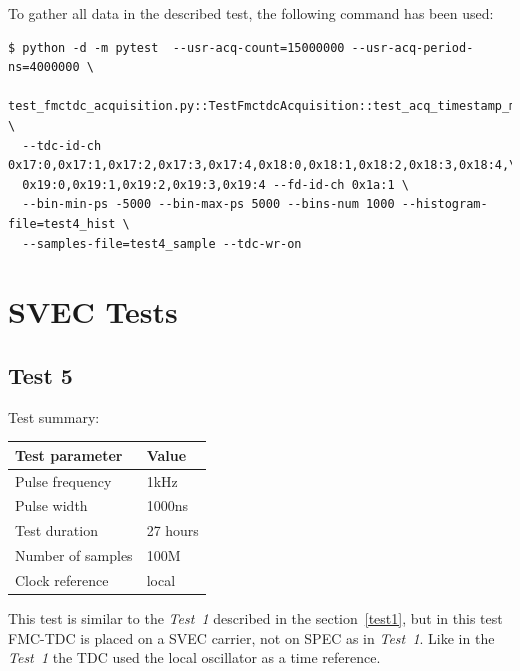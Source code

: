\documentclass[a4paper, 12pt]{article}
\begin{document}
\FloatBarrier

To gather all data in the described test, the following command has been used:
\begin{lstlisting}
$ python -d -m pytest  --usr-acq-count=15000000 --usr-acq-period-ns=4000000 \
  test_fmctdc_acquisition.py::TestFmctdcAcquisition::test_acq_timestamp_multiple_hist \
  --tdc-id-ch 0x17:0,0x17:1,0x17:2,0x17:3,0x17:4,0x18:0,0x18:1,0x18:2,0x18:3,0x18:4,\
  0x19:0,0x19:1,0x19:2,0x19:3,0x19:4 --fd-id-ch 0x1a:1 \
  --bin-min-ps -5000 --bin-max-ps 5000 --bins-num 1000 --histogram-file=test4_hist \
  --samples-file=test4_sample --tdc-wr-on
\end{lstlisting}
\FloatBarrier


\section{SVEC Tests}
\label{svec_tests_setup}

\subsection{Test 5}
\label{test5}

Test summary:
\begin{center}
  \begin{tabular}{|l|l|}
    \hline {\bf Test parameter} & {\bf Value} \\
    \hline
    Pulse frequency                      & 1kHz  \\
    Pulse width                          & 1000ns \\
    Test duration                        & 27 hours \\
    Number of samples                    & 100M \\
    Clock reference                      & local \\
    \hline
  \end{tabular}
\end{center}

This test is similar to the \textit{Test~1} described in the section~\ref{test1},
but in this test FMC-TDC is placed on a SVEC carrier, not on SPEC as in
\textit{Test~1}.
Like in the \textit{Test~1} the TDC used the local oscillator as a time reference.
\end{document}
